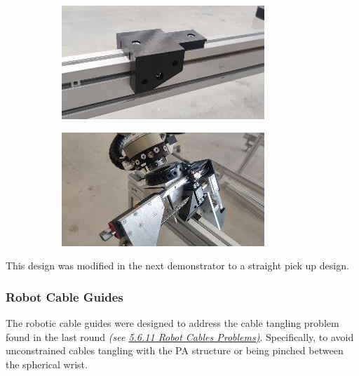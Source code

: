 \documentclass[11pt]{book}
\begin{document}
\begin{figure}[H]
\centering
\begin{subfigure}[b]{0.45\textwidth}
\centering
\includegraphics[width=\textwidth]{./images/image3.jpeg}
\end{subfigure}
\hfill
\begin{subfigure}[b]{0.45\textwidth}
\centering
\includegraphics[width=\textwidth]{./images/image4.jpeg}
\end{subfigure}
\end{figure}


This design was modified in the next demonstrator to a straight pick up design.

\subsubsection{Robot Cable Guides}

The robotic cable guides were designed to address the cable tangling problem found in the last round \textit{\textcolor[HTML]{B7B7B7}{(see \uline{5.6.11 Robot Cables Problems)}}}. Specifically, to avoid unconstrained cables tangling with the PA structure or being pinched between the spherical wrist. 
\end{document}

